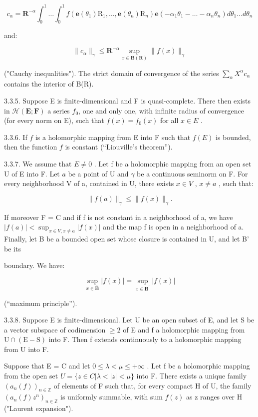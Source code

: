 \[
c _ {\alpha} = \mathbf {R} ^ {- \alpha} \int_ {0} ^ {1} \dots \int_ {0} ^ {1} f (\mathbf {e} (\theta_ {1}) \mathrm{R} _ {1}, \dots , \mathbf {e} (\theta_ {n}) \mathrm{R} _ {n}) \mathbf {e} (- \alpha_ {1} \theta_ {1} - \dots - \alpha_ {n} \theta_ {n}) d \theta_ {1} \dots d \theta_ {n}
\]

and:

\[
\| c _ {\alpha} \| _ {\gamma} \leqslant \mathbf {R} ^ {- \alpha} \sup _ {x \in \mathbf {B} (\mathbf {R})} \| f (x) \| _ {\gamma}
\]

("Cauchy inequalities"). The strict domain of convergence of the series \(\sum_{\alpha} X^{\alpha} c_{\alpha}\) contains the interior of B(R).

3.3.5. Suppose E is finite-dimensional and F is quasi-complete. There then exists in \(\mathcal{H}(\mathbf{E};\mathbf{F})\) a series \(f_{0}\), one and only one, with infinite radius of convergence (for every norm on E), such that \(f(x)=f_{0}(x)\) for all \(x\in E\) .

3.3.6. If \(f\) is a holomorphic mapping from E into F such that \(f(E)\) is bounded, then the function \(f\) is constant (“Liouville’s theorem”).

3.3.7. We assume that \(E \neq 0\) . Let f be a holomorphic mapping from an open set U of E into F. Let \(a\) be a point of U and \(\gamma\) be a continuous seminorm on F. For every neighborhood V of a, contained in U, there exists \(x \in V\) , \(x \neq a\) , such that:

\[
\| f (a) \| _ {\gamma} \leqslant \| f (x) \| _ {\gamma}.
\]

If moreover F = C and if f is not constant in a neighborhood of a, we have \(|f(a)| < \sup_{x \in V, x \neq a} |f(x)|\) and the map f is open in a neighborhood of a. Finally, let B be a bounded open set whose closure is contained in U, and let B' be its

boundary. We have:

\[
\sup _ {x \in \overline {{\mathbf {B}}}} | f (x) | = \sup _ {x \in \mathbf {B} ^ {\prime}} | f (x) |
\]

(“maximum principle”).

3.3.8. Suppose E is finite-dimensional. Let U be an open subset of E, and let S be a vector subspace of codimension \(\geqslant2\) of E and f a holomorphic mapping from \(\mathrm{U}\cap(\mathrm{E}-\mathrm{S})\) into F. Then f extends continuously to a holomorphic mapping from U into F.

Suppose that E = C and let \(0 \leqslant \lambda < \mu \leqslant +\infty\) . Let f be a holomorphic mapping from the open set \(U = \{z \in C | \lambda < |z| < \mu\}\) into F. There exists a unique family \((a_{n}(f))_{n \in \mathbb{Z}}\) of elements of F such that, for every compact H of U, the family \((a_{n}(f)z^{n})_{n \in \mathbb{Z}}\) is uniformly summable, with sum \(f(z)\) as z ranges over H ("Laurent expansion").

